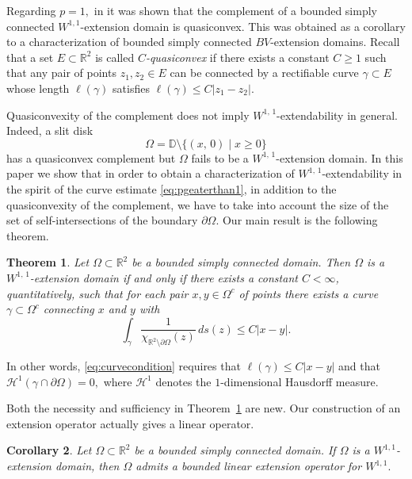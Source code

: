 \documentclass[reqno,11pt]{amsart}
\makeatletter
\def\rr{{\mathbb R}}
\newtheorem{thm}{Theorem}[section]
\newtheorem{cor}[thm]{Corollary}%
\numberwithin{equation}{section}
\theoremstyle{remark}
\makeatother
\begin{document}
Regarding $p=1,$ in \cite[Corollary 1.2]{kosmirsha10} it was shown that the 
complement of a bounded
simply connected $W^{1,1}$-extension domain is quasiconvex.
This was obtained as a corollary to a characterization of 
bounded simply connected $BV$-extension domains.
Recall that a set $E \subset \mathbb R^2$
is called {\it $C$-quasiconvex} if there exists a constant $C\ge1$ such that 
any pair of 
points $z_1,z_2 \in E$ can be connected by a rectifiable curve 
$\gamma \subset E$
whose length $\ell(\gamma)$ satisfies $\ell(\gamma) \le C|z_1-z_2|$. 


Quasiconvexity of the complement does not imply $W^{1,\,1}$-extendability in 
general. Indeed, a slit disk
$$\Omega=\mathbb D\setminus\{(x,\,0)\mid x\ge 0 \}$$
has a quasiconvex complement but $\Omega$ fails to be a $W^{1,\,1}$-extension 
domain. 
In this paper we show that in order to obtain a characterization of 
$W^{1,\,1}$-extendability
in the spirit of the curve estimate \eqref{eq:pgeaterthan1}, in addition to 
the quasiconvexity of the complement,
we have to take into account the size of the set of self-intersections of the 
boundary $\partial \Omega$.
Our main result is the following theorem.

\begin{thm}\label{thm:main}
 Let $\Omega \subset \rr^2$ be a bounded simply connected domain. Then $\Omega$ is a $W^{1,\,1}$-extension domain
 if and only if there exists a constant $C < \infty$, quantitatively, such that
 for each pair $x,y \in \Omega^c$ of points there exists a curve 
$\gamma \subset \Omega^c$ connecting $x$ and $y$ with
 \begin{equation}\label{eq:curvecondition}
  \int_\gamma\frac{1}{\chi_{\rr^2\setminus \partial\Omega}(z)}\,ds(z) \le C|x-y|.
 \end{equation} 
\end{thm}

In other words, \eqref{eq:curvecondition} requires that $\ell(\gamma)\le
C|x-y|$ and that $\mathcal H^1(\gamma\cap \partial \Omega)=0,$ where $\mathcal H^1$ denotes the $1$-dimensional Hausdorff measure. 

Both the necessity and sufficiency in Theorem~\ref{thm:main} are new.
Our construction of an extension operator actually gives a linear operator.

\begin{cor}\label{hakotu}
Let $\Omega \subset \rr^2$ be a bounded simply connected domain.
If $\Omega$ is a $W^{1,1}$-extension domain, then $\Omega$ admits a bounded
linear extension operator for $W^{1,1}.$
\end{cor}
\end{document}
